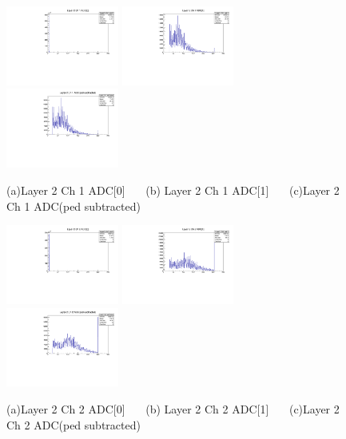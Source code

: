\documentclass[a4paper,11pt]{article}
\theoremstyle{mytheor}
\begin{document}
\begin{figure}[H] 
\vspace*{-0.3cm} 
\includegraphics[width=0.33\textwidth,scale=0.5,trim=0 0 0 0,clip]{plotsdir/file0_test-Layer2_Ch1_adc0-1.pdf} 
\includegraphics[width=0.33\textwidth,scale=0.5,trim=0 0 0 0,clip]{plotsdir/file0_test-Layer2_Ch1_adc1-1.pdf} 
\includegraphics[width=0.33\textwidth,scale=0.5,trim=0 0 0 0,clip]{plotsdir/file0_test-Layer2_Ch1_adcPedsub-1.pdf} 
\caption{(a)Layer 2 Ch 1 ADC[0] ~~~(b) Layer 2 Ch 1 ADC[1] ~~~(c)Layer 2 Ch 1 ADC(ped subtracted) } 
\end{figure} 
\begin{figure}[H] 
\vspace*{-0.3cm} 
\includegraphics[width=0.33\textwidth,scale=0.5,trim=0 0 0 0,clip]{plotsdir/file0_test-Layer2_Ch2_adc0-1.pdf} 
\includegraphics[width=0.33\textwidth,scale=0.5,trim=0 0 0 0,clip]{plotsdir/file0_test-Layer2_Ch2_adc1-1.pdf} 
\includegraphics[width=0.33\textwidth,scale=0.5,trim=0 0 0 0,clip]{plotsdir/file0_test-Layer2_Ch2_adcPedsub-1.pdf} 
\caption{(a)Layer 2 Ch 2 ADC[0] ~~~(b) Layer 2 Ch 2 ADC[1] ~~~(c)Layer 2 Ch 2 ADC(ped subtracted) } 
\end{figure} 
\end{document}
